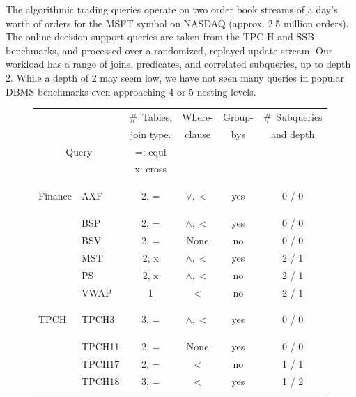 The algorithmic trading queries operate on two order book streams of a day's
worth of orders for the MSFT symbol on NASDAQ (approx. 2.5 million orders). The
online decision support queries are taken from the TPC-H and SSB benchmarks, and
processed over a randomized, replayed update stream.
Our workload has a range of joins, predicates, and correlated
subqueries, up to depth 2. While a depth of 2 may seem low, we have not seen
many queries in popular DBMS benchmarks even approaching 4 or 5 nesting levels.

\begin{figure}[t]
\scriptsize{
\begin{center}
\begin{tabular}{ p{0.15cm} | l | c | c | c  | c }
\multicolumn{2}{c|}{}      & \#~Tables,  & Where- & Group- & \#~Subqueries\\
\multicolumn{2}{c|}{}      & join type.  & clause & bys    & and depth\\
\multicolumn{2}{c|}{Query} & =: equi     &        &        & \\
\multicolumn{2}{c|}{}      & x: cross    &        &        & \\
\hline
\begin{rotate}{90}\hspace{-1.1cm}Finance\end{rotate}
& AXF        & 2, =      & $\vee, <$     & yes & 0 / 0 \\
& BSP        & 2, =      & $\wedge, <$   & yes & 0 / 0 \\
& BSV        & 2, =      & None          & no  & 0 / 0 \\
& MST        & 2, x      & $\wedge, <$   & yes & 2 / 1 \\
& PS         & 2, x      & $\wedge, <$   & no  & 2 / 1 \\
& VWAP       & 1         & $<$           & no  & 2 / 1 \\
\hline
\begin{rotate}{90}\hspace{-1.1cm}TPCH\end{rotate}
& TPCH3      & 3, =      & $\wedge, <$   & yes & 0 / 0 \\
& TPCH11     & 2, =      & None          & yes & 0 / 0 \\
& TPCH17     & 2, =      & $<$           & no  & 1 / 1 \\
& TPCH18     & 3, =      & $<$           & yes & 1 / 2 \\

\end{tabular}
\end{center}}
\end{figure}
